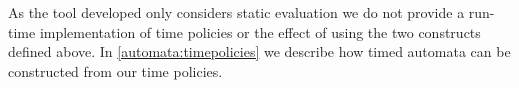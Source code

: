 
As the tool developed only considers static evaluation we do not provide a run-time implementation of time policies or the effect of using the two constructs defined above.
In \cref{automata:timepolicies} we describe how timed automata can be constructed from our time policies.
